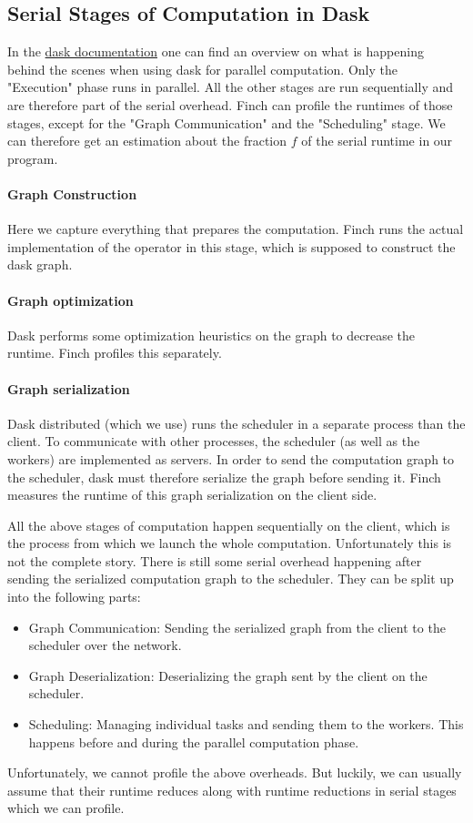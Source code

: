 \subsection{Serial Stages of Computation in Dask}

In the \href{https://docs.dask.org/en/stable/phases-of-computation.html}{dask documentation} one can find an overview on what is happening behind the scenes when using dask for parallel computation.
Only the "Execution" phase runs in parallel.
All the other stages are run sequentially and are therefore part of the serial overhead.
Finch can profile the runtimes of those stages, except for the "Graph Communication" and the "Scheduling" stage.
We can therefore get an estimation about the fraction $f$ of the serial runtime in our program.

\paragraph{Graph Construction}
Here we capture everything that prepares the computation.
Finch runs the actual implementation of the operator in this stage, which is supposed to construct the dask graph.

\paragraph{Graph optimization}
Dask performs some optimization heuristics on the graph to decrease the runtime.
Finch profiles this separately.

\paragraph{Graph serialization}
Dask distributed (which we use) runs the scheduler in a separate process than the client.
To communicate with other processes, the scheduler (as well as the workers) are implemented as servers.
In order to send the computation graph to the scheduler, dask must therefore serialize the graph before sending it.
Finch measures the runtime of this graph serialization on the client side.

All the above stages of computation happen sequentially on the client, which is the process from which we launch the whole computation.
Unfortunately this is not the complete story.
There is still some serial overhead happening after sending the serialized computation graph to the scheduler.
They can be split up into the following parts:
\begin{itemize}
    \item Graph Communication: Sending the serialized graph from the client to the scheduler over the network.
    \item Graph Deserialization: Deserializing the graph sent by the client on the scheduler.
    \item Scheduling: Managing individual tasks and sending them to the workers. This happens before and during the parallel computation phase.
\end{itemize}

Unfortunately, we cannot profile the above overheads.
But luckily, we can usually assume that their runtime reduces along with runtime reductions in serial stages which we can profile.
